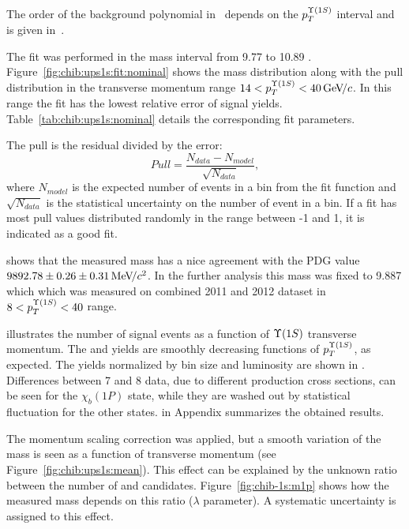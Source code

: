 The order of the background polynomial in~ depends on the
$p_{T}^{\OneS}$ interval and is given in~.



The fit was performed in the mass interval from  9.77 \gevcc to 10.89 \gevcc.
Figure~\ref{fig:chib:ups1s:fit:nominal} shows the mass distribution along with
the pull distribution in the transverse momentum range $14 < p_T^{\OneS} < 40
\gevc$. In this range the fit has the lowest relative error of signal yields. 
Table~\ref{tab:chib:ups1s:nominal} details the corresponding fit parameters.

The pull is the residual divided by the error:
\begin{equation}
\label{eq:pull}
Pull = \frac{N_{data} - N_{model}}{\sqrt{N_{data}}},
\end{equation}
\noindent where $N_{model}$ is the expected number of events in a bin from
the fit function and $\sqrt{N_{data}}$ is the statistical uncertainty on the
number of event in a bin. If a fit has most pull values distributed randomly 
in the range between -1 and 1, it is indicated as a good fit.





 shows that the measured \chiboneOneP mass
has a nice agreement with the PDG value $9892.78 \pm 0.26 \pm 0.31 {\mathrm{\,Me\kern -0.1em V\!/}c^2}$. In
the further analysis this mass was fixed to 9.887 \gevcc which which was
measured on combined 2011 and 2012 dataset in $8<p_T^{\Y1S}<40$ range.


 illustrates the number of signal events as
a function of $\Y1S$ transverse momentum. The \chibOneP and \chibThreeP yields
are smoothly decreasing functions of $p_T^{\Y1S}$, as expected. The yields
normalized by bin size and luminosity are shown in
. Differences between 7 and 8\tev
data, due to different production cross sections, can be seen for the
$\chi_b(1P)$ state, while they are washed out by statistical fluctuation for
the other states.  in Appendix summarizes the
obtained results.



The momentum scaling correction was applied, but a smooth variation of the
\chiboneOneP mass is seen as a function of transverse momentum (see
Figure~\ref{fig:chib:ups1s:mean}). This effect can be explained by the unknown
ratio between the number of \chiboneOneP and \chiboneTwoP candidates.
Figure~\ref{fig:chib-1s:m1p} shows how the measured mass depends on this ratio
($\lambda$ parameter). A systematic uncertainty is assigned to this effect.

